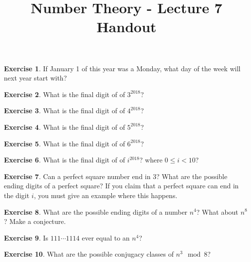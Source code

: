 \documentclass[11pt]{article}
\theoremstyle{definition}
\newtheorem{exercise}{Exercise}
\numberwithin{thm}{section}
\begin{document}
\title{Number Theory - Lecture 7 Handout}

\maketitle


\begin{exercise} If January 1 of this year was a Monday, what day of the week will next year start with?
\end{exercise}

\begin{exercise} What is the final digit of of $3^{2018}$?
\end{exercise}

\begin{exercise} What is the final digit of of $4^{2018}$?
\end{exercise}

\begin{exercise} What is the final digit of of $5^{2018}$?
\end{exercise}

\begin{exercise} What is the final digit of of $6^{2018}$?
\end{exercise}

\begin{exercise} What is the final digit of of $i^{2018}$? where $0\leq i < 10$?
\end{exercise}

\begin{exercise} Can a perfect square number end in $3$? What are the possible ending digits of a perfect square? If you claim that a perfect square can end in the digit $i$, you must give an example where this happens.
\end{exercise}

\begin{exercise} What are the possible ending digits of a number $n^4$? What about $n^8$? Make a conjecture.
\end{exercise}

\begin{exercise} Is $111 \cdots 1114$ ever equal to an $n^4$?
\end{exercise}

\begin{exercise} What are the possible conjugacy classes of $n^3 \mod 8$?
\end{exercise}
\end{document}
